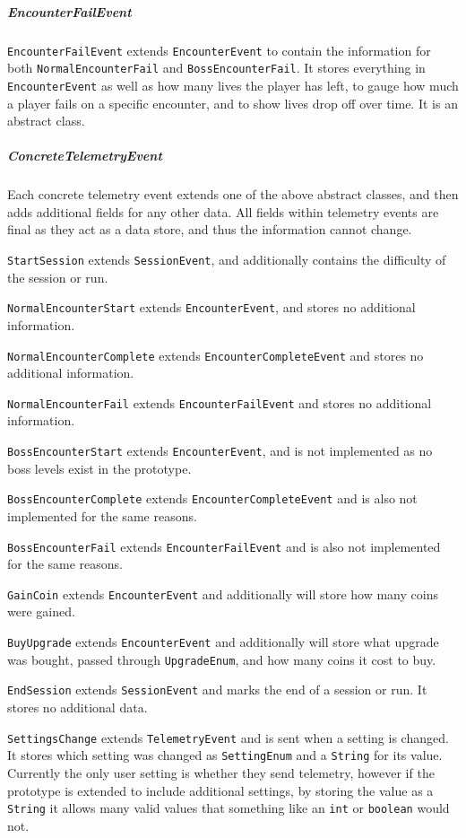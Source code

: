 \subparagraph{EncounterFailEvent}
\texttt{EncounterFailEvent} extends \texttt{EncounterEvent} to contain the information for both \texttt{NormalEncounterFail} and \texttt{BossEncounterFail}. It stores everything in \texttt{EncounterEvent} as well as how many lives the player has left, to gauge how much a player fails on a specific encounter, and to show lives drop off over time. It is an abstract class.

\subparagraph{ConcreteTelemetryEvent}
Each concrete telemetry event extends one of the above abstract classes, and then adds additional fields for any other data. All fields within telemetry events are final as they act as a data store, and thus the information cannot change.

\texttt{StartSession} extends \texttt{SessionEvent}, and additionally contains the difficulty of the session or run.

\texttt{NormalEncounterStart} extends \texttt{EncounterEvent}, and stores no additional information.

\texttt{NormalEncounterComplete} extends \texttt{EncounterCompleteEvent} and stores no additional information.

\texttt{NormalEncounterFail} extends \texttt{EncounterFailEvent} and stores no additional information.

\texttt{BossEncounterStart} extends \texttt{EncounterEvent}, and is not implemented as no boss levels exist in the prototype.

\texttt{BossEncounterComplete} extends \texttt{EncounterCompleteEvent} and is also not implemented for the same reasons.

\texttt{BossEncounterFail} extends \texttt{EncounterFailEvent} and is also not implemented for the same reasons.

\texttt{GainCoin} extends \texttt{EncounterEvent} and additionally will store how many coins were gained.

\texttt{BuyUpgrade} extends \texttt{EncounterEvent} and additionally will store what upgrade was bought, passed through \texttt{UpgradeEnum}, and how many coins it cost to buy.

\texttt{EndSession} extends \texttt{SessionEvent} and marks the end of a session or run. It stores no additional data.

\texttt{SettingsChange} extends \texttt{TelemetryEvent} and is sent when a setting is changed. It stores which setting was changed as \texttt{SettingEnum} and a \texttt{String} for its value. Currently the only user setting is whether they send telemetry, however if the prototype is extended to include additional settings, by storing the value as a \texttt{String} it allows many valid values that something like an \texttt{int} or \texttt{boolean} would not.

